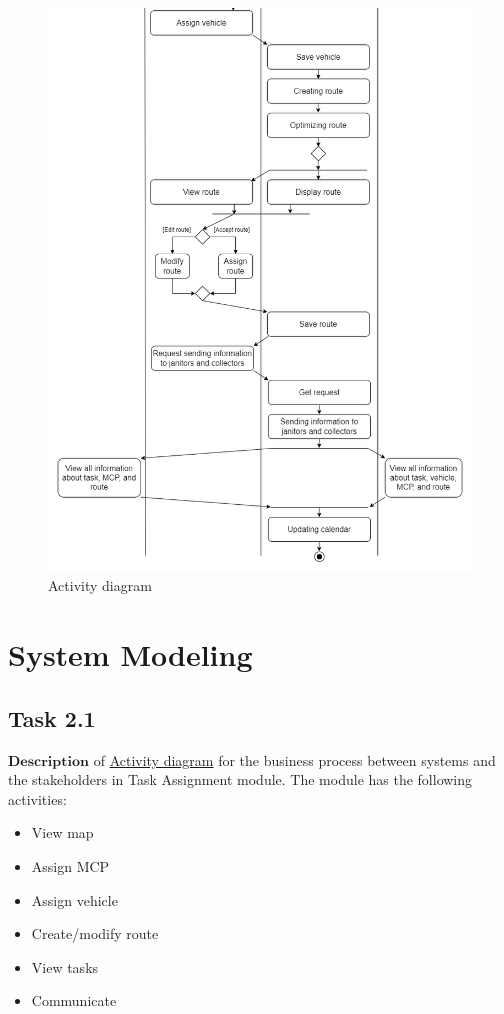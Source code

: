 \documentclass[a4paper]{article}
\begin{document}
\begin{figure}
\centering
  \includegraphics[width=1\linewidth]{ActivityDiagram2.png}
  \caption{Activity diagram}
\end{figure}
\newpage

\section{System Modeling}
\subsection{Task 2.1}
$\textbf{Description}$ of \hyperlink{activity}{Activity diagram} for the business process between systems and the stakeholders in Task Assignment module. The module has the following activities:

\begin{itemize}
    \item View map
    \item Assign MCP
    \item Assign vehicle
    \item Create/modify route
    \item View tasks
    \item Communicate
\end{itemize}
\end{document}
